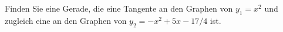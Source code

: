 \item Finden Sie eine Gerade, die eine Tangente an den Graphen von $y_1=x^2$ und zugleich eine an den Graphen
von $y_2=-x^2+5x-17/4$ ist.

